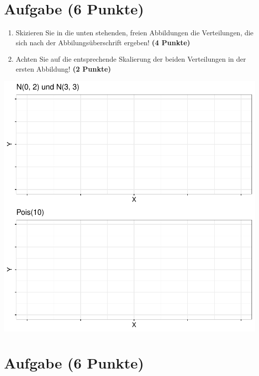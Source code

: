 \documentclass[a4paper, 10pt]{scrartcl}\usepackage[]{graphicx}\usepackage[]{color}
\makeatletter
\def\maxwidth{ %
  \ifdim\Gin@nat@width>\linewidth
    \linewidth
  \else
    \Gin@nat@width
  \fi
}
\makeatother
\begin{document}
\section{Aufgabe \hfill (6 Punkte)}



\begin{enumerate}
\item Skizieren Sie in die unten stehenden, freien Abbildungen die
  Verteilungen, die sich nach der Abbilungs{\"u}berschrift ergeben! \textbf{(4
    Punkte)}
\item Achten Sie auf die entsprechende Skalierung der beiden Verteilungen
  in der ersten Abbildung! \textbf{(2 Punkte)}
\end{enumerate}



{\centering \includegraphics[width=\maxwidth]{img/histogram-01-1} 

}



 
\clearpage

\section{Aufgabe \hfill (6 Punkte)}
\end{document}
